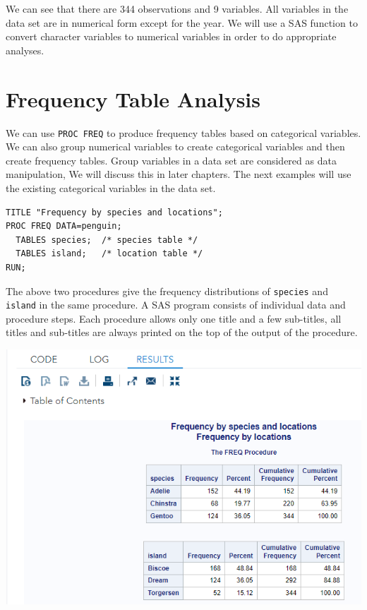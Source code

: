 \documentclass[
]{book}
\begin{document}
We can see that there are 344 observations and 9 variables. All variables in the data set are in numerical form except for the year. We will use a SAS function to convert character variables to numerical variables in order to do appropriate analyses.

\hypertarget{frequency-table-analysis}{%
\section{Frequency Table Analysis}\label{frequency-table-analysis}}

We can use \texttt{PROC\ FREQ} to produce frequency tables based on categorical variables. We can also group numerical variables to create categorical variables and then create frequency tables. Group variables in a data set are considered as data manipulation, We will discuss this in later chapters. The next examples will use the existing categorical variables in the data set.

\begin{verbatim}
TITLE "Frequency by species and locations";
PROC FREQ DATA=penguin;
  TABLES species;  /* species table */
  TABLES island;   /* location table */
RUN;
\end{verbatim}

The above two procedures give the frequency distributions of \texttt{species} and \texttt{island} in the same procedure. A SAS program consists of individual data and procedure steps. Each procedure allows only one title and a few sub-titles, all titles and sub-titles are always printed on the top of the output of the procedure.

\begin{center}\includegraphics[width=1\linewidth]{img05/w05-1wayFreqTable} \end{center}
\end{document}
